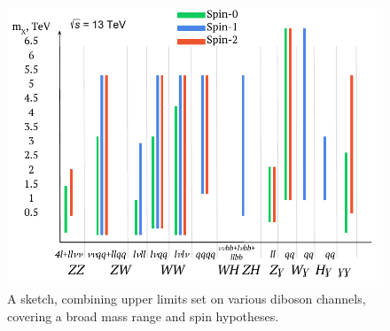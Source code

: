 \documentclass{PoS}
\begin{document}
  \begin{figure}
    \begin{center} 
    \includegraphics[width=.65\textwidth]{figures/lim_sketch}
    \end{center}
     \caption{A sketch, combining upper limits set on various diboson channels, covering a broad mass range and spin hypotheses.}
     \label{fig:summary}
     \end{figure}







%
\end{document}
